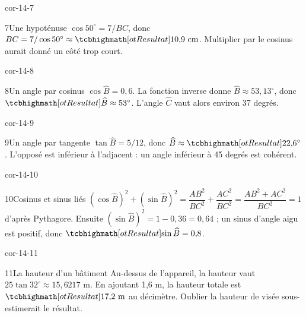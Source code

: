 \begin{blocLivre}{cor-14-7}\begin{corrige}{7}{Une hypoténuse}
$\cos50^\circ=7/BC$, donc $BC=7/\cos50^\circ\approx\res{10{,}9\text{ cm}}$. Multiplier par le cosinus aurait donné un côté trop court.
\label{fig-cor-14-7}
\end{corrige}\end{blocLivre}
\begin{blocLivre}{cor-14-8}\begin{corrige}{8}{Un angle par cosinus}
$\cos\widehat B=0{,}6$. La fonction inverse donne $\widehat B\approx53{,}13^\circ$, donc $\res{\widehat B\approx53^\circ}$. L’angle $\widehat C$ vaut alors environ 37 degrés.
\label{fig-cor-14-8}
\end{corrige}\end{blocLivre}
\begin{blocLivre}{cor-14-9}\begin{corrige}{9}{Un angle par tangente}
$\tan\widehat B=5/12$, donc $\widehat B\approx\res{22{,}6^\circ}$. L’opposé est inférieur à l’adjacent : un angle inférieur à 45 degrés est cohérent.
\label{fig-cor-14-9}
\end{corrige}\end{blocLivre}
\begin{blocLivre}{cor-14-10}\begin{corrige}{10}{Cosinus et sinus liés}
$(\cos\widehat B)^2+(\sin\widehat B)^2=\dfrac{AB^2}{BC^2}+\dfrac{AC^2}{BC^2}=\dfrac{AB^2+AC^2}{BC^2}=1$ d’après Pythagore. Ensuite $(\sin\widehat B)^2=1-0{,}36=0{,}64$ ; un sinus d’angle aigu est positif, donc $\res{\sin\widehat B=0{,}8}$.
\label{fig-cor-14-10}
\end{corrige}\end{blocLivre}
\begin{blocLivre}{cor-14-11}\begin{corrige}{11}{La hauteur d’un bâtiment}
Au-dessus de l’appareil, la hauteur vaut $25\tan32^\circ\approx15{,}6217$ m. En ajoutant 1,6 m, la hauteur totale est $\res{17{,}2\text{ m}}$ au décimètre. Oublier la hauteur de visée sous-estimerait le résultat.
\label{fig-cor-14-11}
\end{corrige}\end{blocLivre}
